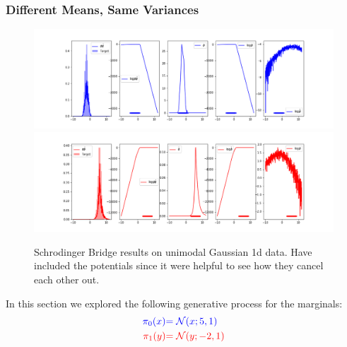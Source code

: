 \documentclass[a4paper,12pt,twoside,openright]{report}
\theoremstyle{definition}
\begin{document}
\subsubsection{Different Means, Same Variances}
\begin{figure}
    \centering
    \includegraphics[scale=0.45,trim={4.3cm 0.2cm 1.5cm 0}, clip]{images/Pavon/Forward_unimodal_working_pavon_relu_nn500.png}\\\vspace{-0.2cm}
    \includegraphics[scale=0.45,trim={4.3cm 0 1.5cm 1.5cm}, clip]{images/Pavon/Backward_unimodal_working_pavon_relu_nn500.png} 
    \caption{Schrodinger Bridge results on unimodal Gaussian 1d data. Have included the potentials since it  were helpful to see how they cancel each other out. }
    \label{fig:driftpavon}
\end{figure}
In this section we explored the following generative process for the marginals:
\begin{align*}
\color{blue}{\pi_0(x)} &\color{blue}{= {\mathcal{N}}(x; 5,  1)} \\
    \color{red}{\pi_1(y)} &\color{red}{= {\mathcal{N}}(y; -2, 1)} 
\end{align*}
\end{document}
